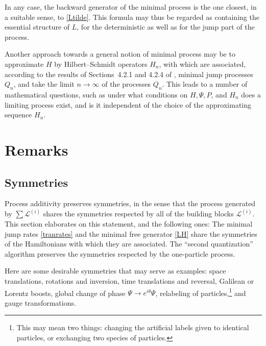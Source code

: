 \documentclass[12pt]{article}
\newcommand{\E}{e} %
\newcommand{\I}{i} %
\newcommand{\1}{\mathbf{1}} %
\newcommand{\generator}{\mathscr{L}} %
\newcommand{\pov}{{P}}%
\begin{document}
In any case, the backward generator of the minimal process is the one
closest, in a suitable sense, to \eqref{Ltilde}.  This formula may
thus be regarded as containing the essential structure of $L$, for the
deterministic as well as for the jump part of the process.

Another approach towards a general notion of minimal process may be to
approximate $H$ by Hilbert--Schmidt operators $H_n$, with which are
associated, according to the results of Sections~4.2.1 and 4.2.4 of
\cite{crea2A}, minimal jump processes $Q_n$, and take the limit $n \to
\infty$ of the processes $Q_n$. This leads to a number of mathematical
questions, such as under what conditions on $H, \Psi, \pov$, and $H_n$
does a limiting process exist, and is it independent of the choice of
the approximating sequence $H_n$.






\section{Remarks}\label{sec:remarks}

\subsection{Symmetries}\label{sec:symm}

Process additivity preserves symmetries, in the sense that the process
generated by $\sum \generator^{(i)}$ shares the symmetries respected
by all of the building blocks $\generator^{(i)}$.  This section
elaborates on this statement, and the following ones: The minimal jump
rates \eqref{tranrates} and the minimal free generator \eqref{LH}
share the symmetries of the Hamiltonians with which they are
associated. The ``second quantization'' algorithm preserves the
symmetries respected by the one-particle process.

Here are some desirable symmetries that may serve as examples: space
translations, rotations and inversion, time translations and
reversal, Galilean or Lorentz boosts, global change of phase $\Psi \to
\E^{\I\theta} \Psi$, relabeling of particles,\footnote{This may mean
two things: changing the artificial labels given to identical
particles, or exchanging two species of particles.}  and gauge
transformations.
\end{document}
